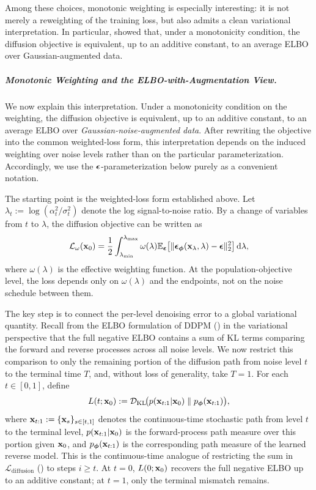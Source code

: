Among these choices, monotonic weighting is especially interesting: it is not merely a reweighting of the training loss, but also admits a clean variational interpretation. In particular, \citet{kim2022soft,kingma2023understanding} showed that, under a monotonicity condition, the diffusion objective is equivalent, up to an additive constant, to an average ELBO over Gaussian-augmented data.

\subparagraph{Monotonic Weighting and the ELBO-with-Augmentation View.}
We now explain this interpretation. Under a monotonicity condition on the weighting, the
diffusion objective is equivalent, up to an additive constant, to an
average ELBO over \emph{Gaussian-noise-augmented data}. After rewriting the objective into the common weighted-loss form, this interpretation depends on the induced weighting over noise levels rather than on the particular parameterization. Accordingly, we use the ${\bm{\epsilon}}$-parameterization below purely as a convenient notation.

The starting point is the weighted-loss form established above. Let
$\lambda_t := \log(\alpha_t^2/\sigma_t^2)$ denote the log
signal-to-noise ratio. By a change of variables from $t$ to $\lambda$,
the diffusion objective can be written as
\[
\mathcal{L}_\omega({\mathbf{x}}_0)
= \frac{1}{2}
\int_{\lambda_{\min}}^{\lambda_{\max}}
\omega(\lambda) 
\mathbb{E}_{{\bm{\epsilon}}}\!\left[
\|{\bm{\epsilon}}_{\bm{\phi}}({\mathbf{x}}_\lambda,\lambda)-{\bm{\epsilon}}\|_2^2
\right]
\mathop{}\!\mathrm{d}\lambda,
\]
where $\omega(\lambda)$ is the effective weighting function. At the
population-objective level, the loss depends only on $\omega(\lambda)$ and
the endpoints, not on the noise schedule between them.

The key step is to connect the per-level denoising error to a global variational quantity. Recall from the ELBO formulation of DDPM () in the variational perspective that the full negative ELBO
contains a sum of KL terms comparing the forward and reverse processes
across all noise levels. We now restrict this comparison to only the
remaining portion of the diffusion path from noise level $t$ to the
terminal time $T$, and, without loss of generality, take $T=1$. For
each $t \in [0,1]$, define
\begin{equation}\label{eq:partial-chain-kl}
L(t;{\mathbf{x}}_0)
:=
\mathcal{D}_{\mathrm{KL}}\!\big(
  p({\mathbf{x}}_{t:1} |{\mathbf{x}}_0)
  \;\|\;
  p_{\bm{\phi}}({\mathbf{x}}_{t:1})
\big),
\end{equation}
where ${\mathbf{x}}_{t:1} := \{{\mathbf{x}}_s\}_{s \in [t,1]}$ denotes the
continuous-time stochastic path from level $t$ to the terminal level,
$p({\mathbf{x}}_{t:1} |{\mathbf{x}}_0)$ is the forward-process path measure over
this portion given ${\mathbf{x}}_0$, and $p_{\bm{\phi}}({\mathbf{x}}_{t:1})$ is the
corresponding path measure of the learned reverse model. This is the
continuous-time analogue of restricting the sum in
$\mathcal{L}_{\mathrm{diffusion}}$ () to steps
$i \geq t$. At $t = 0$, $L(0;{\mathbf{x}}_0)$ recovers the full negative ELBO
up to an additive constant; at $t = 1$, only the terminal mismatch
remains.

